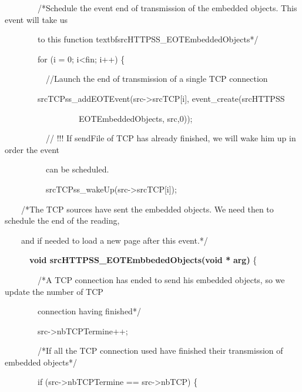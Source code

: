 \documentclass[a4paper]{article}
\begin{document}
{
\ \ \ \ \ \ \ \ /*Schedule the event end of transmission of the embedded objects. This event will take us

{
\ \ \ \ \ \ \ \ to this function textbf{srcHTTPSS\_EOTEmbeddedObjects*/}}

{
\ \ \ \ \ \ \ \ for (i = 0; i{\textless}fin; i++) \{}

{
\ \ \ \ \ \ \ \ \ \ //Launch the end of transmission of a single TCP connection}

{
\ \ \ \ \ \ \ \ srcTCPss\_addEOTEvent(src-{\textgreater}srcTCP[i], event\_create(srcHTTPSS}

{
\ \ \ \ \ \ \ \ \ \ \ \ \ \ \ \ \ \ EOTEmbeddedObjects, src,0));}

{
\ \ \ \ \ \ \ \ \ \ // !!! If sendFile of TCP has already finished, we will wake him up in order the event}

{
\ \ \ \ \ \ \ \ \ \ can be scheduled.}

{
\ \ \ \ \ \ \ \ \ \ srcTCPss\_wakeUp(src-{\textgreater}srcTCP[i]);}

\pagebreak

{
\ \ \ \ /*The TCP sources have sent the embedded objects. We need then to schedule the end of the reading,}

{
\ \ \ \ and if needed to load a new page after this event.*/}

\bigskip

{
\ \ \ \ \ \ \textbf{void srcHTTPSS\_EOTEmbbededObjects(}\textbf{void *}\textbf{ arg)} \{}

\bigskip

{
\ \ \ \ \ \ \ \ /*A TCP connection has ended to send his embedded objects, so we update the number of TCP}

{
\ \ \ \ \ \ \ \ connection having finished*/}

{
\ \ \ \ \ \ \ \ src-{\textgreater}nbTCPTermine++;}

\bigskip

{
\ \ \ \ \ \ \ \ /*If all the TCP connection used have finished their transmission of embedded objects*/}

{
\ \ \ \ \ \ \ \ if (src-{\textgreater}nbTCPTermine == src-{\textgreater}nbTCP) \{}

}
\end{document}
